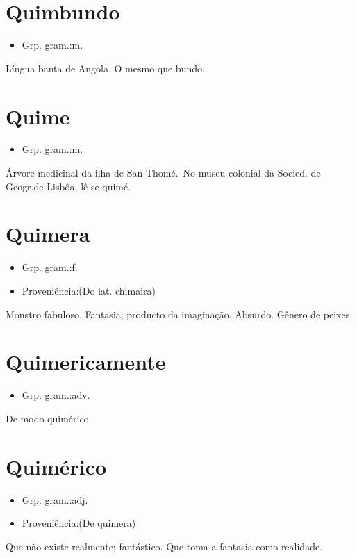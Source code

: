 \section{Quimbundo}
\begin{itemize}
\item {Grp. gram.:m.}
\end{itemize}
Língua banta de Angola.
O mesmo que \textunderscore bundo\textunderscore .
\section{Quime}
\begin{itemize}
\item {Grp. gram.:m.}
\end{itemize}
Árvore medicinal da ilha de San-Thomé.--No museu colonial da \textunderscore Socied. de Geogr.\textunderscore  de Lisbôa, lê-se \textunderscore quimé\textunderscore .
\section{Quimera}
\begin{itemize}
\item {Grp. gram.:f.}
\end{itemize}
\begin{itemize}
\item {Proveniência:(Do lat. \textunderscore chimaira\textunderscore )}
\end{itemize}
Monstro fabuloso.
Fantasia; producto da imaginação.
Absurdo.
Gênero de peixes.
\section{Quimericamente}
\begin{itemize}
\item {Grp. gram.:adv.}
\end{itemize}
De modo \textunderscore quimérico\textunderscore .
\section{Quimérico}
\begin{itemize}
\item {Grp. gram.:adj.}
\end{itemize}
\begin{itemize}
\item {Proveniência:(De \textunderscore quimera\textunderscore )}
\end{itemize}
Que não existe realmente; fantástico.
Que toma a fantasia como realidade.
